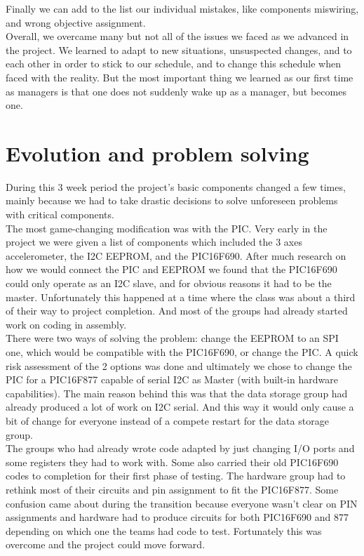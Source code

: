 \documentclass[12pt]{article}
\begin{document}
	Finally we can add to the list our individual mistakes, like components miswiring, and wrong objective assignment.\\

	Overall, we overcame many but not all of the issues we faced as we advanced in the project. We learned to adapt to new situations, unsuspected changes, and to each other in order to stick to our schedule, and to change this schedule when faced with the reality. But the most important thing we learned as our first time as managers is that one does not suddenly wake up as a manager, but becomes one.

\newpage
\section{Evolution and problem solving}

	During this 3 week period the project’s basic components changed a few times, mainly because we had to take drastic decisions to solve unforeseen problems with critical components.\\

	The most game-changing modification was with the PIC. Very early in the project we were given a list of components which included the 3 axes accelerometer, the I2C EEPROM, and the PIC16F690. After much research on how we would connect the PIC and EEPROM we found that the PIC16F690 could only operate as an I2C slave\cite{690}, and for obvious reasons it had to be the master. Unfortunately this happened at a time where the class was about a third of their way to project completion.  And most of the groups had already started work on coding in assembly.\\

	There were two ways of solving the problem: change the EEPROM to an SPI one, which would be compatible with the PIC16F690, or change the PIC. A quick risk assessment of the 2 options was done and ultimately we chose to change the PIC for a PIC16F877 capable of serial I2C as Master (with built-in hardware capabilities). The main reason behind this was that the data storage group had already produced a lot of work on I2C serial. And this way it would only cause a bit of change for everyone instead of a compete restart for the data storage group.\\

	The groups who had already wrote code adapted by just changing I/O ports and some registers they had to work with. Some also carried their old PIC16F690 codes to completion for their first phase of testing. The hardware group had to rethink most of their circuits and pin assignment to fit the PIC16F877. Some confusion came about during the transition because everyone wasn’t clear on PIN assignments and hardware had to produce circuits for both PIC16F690 and 877 depending on which one the teams had code to test. Fortunately this was overcome and the project could move forward. \\
\end{document}
